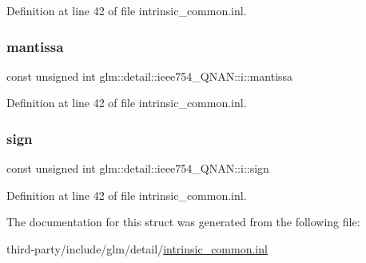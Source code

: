 Definition at line 42 of file intrinsic\+\_\+common.\+inl.

\mbox{\label{structglm_1_1detail_1_1ieee754___q_n_a_n_1_1i_a1999926defcba631a716bee7d3044d0a}} 
\subsubsection{\texorpdfstring{mantissa}{mantissa}}
{\footnotesize\ttfamily const unsigned int glm\+::detail\+::ieee754\+\_\+\+Q\+N\+A\+N\+::i\+::mantissa}



Definition at line 42 of file intrinsic\+\_\+common.\+inl.

\mbox{\label{structglm_1_1detail_1_1ieee754___q_n_a_n_1_1i_a5dd7e174864b6a8cd045563dde44f305}} 
\subsubsection{\texorpdfstring{sign}{sign}}
{\footnotesize\ttfamily const unsigned int glm\+::detail\+::ieee754\+\_\+\+Q\+N\+A\+N\+::i\+::sign}



Definition at line 42 of file intrinsic\+\_\+common.\+inl.



The documentation for this struct was generated from the following file\+:\begin{DoxyCompactItemize}
\item 
third-\/party/include/glm/detail/\hyperlink{intrinsic__common_8inl}{intrinsic\+\_\+common.\+inl}\end{DoxyCompactItemize}
